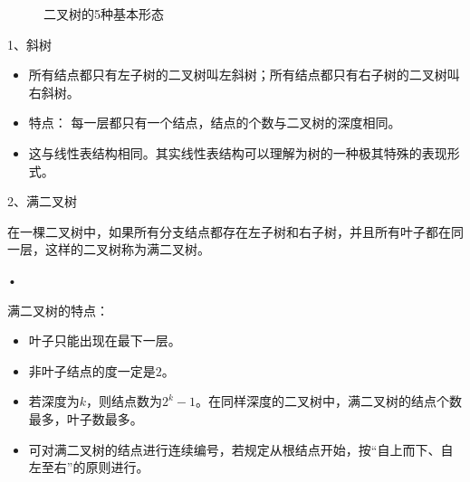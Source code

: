 \begin{frame}%

\begin{figure}
\centering

\caption{二叉树的5种基本形态}
\end{figure}

\end{frame}
%
\begin{frame}
 1、斜树
 \begin{itemize}
  \item 所有结点都只有左子树的二叉树叫左斜树；所有结点都只有右子树的二叉树叫右斜树。%
  \item \textcolor{acolor5}{特点：} 每一层都只有一个结点，结点的个数与二叉树的深度相同。%
  \item 这与线性表结构相同。其实线性表结构可以理解为树的一种极其特殊的表现形式。
  \end{itemize}
\end{frame}
%
%
\begin{frame}
2、满二叉树

在一棵二叉树中，如果所有分支结点都存在左子树和右子树，并且所有叶子都在同一层，这样的二叉树称为满二叉树。



\begin{figure}
\centering

\end{figure}•
\end{frame}
%
%
\begin{frame}
\textcolor{acolor5}{满二叉树的特点：}
\begin{itemize}
\item 
叶子只能出现在最下一层。
\item 
非叶子结点的度一定是$2$。
\item 
若深度为$k$，则结点数为$2^k-1$。在同样深度的二叉树中，满二叉树的结点个数最多，叶子数最多。
\item   
可对满二叉树的结点进行连续编号，若规定从根结点开始，按“自上而下、自左至右”的原则进行。
\end{itemize}

\end{frame}
%
%
